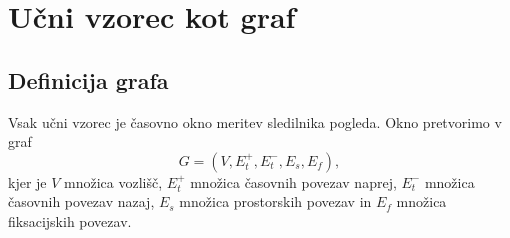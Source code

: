 
\section{Učni vzorec kot graf}
\label{subsec:ucni-vzorec}

\subsection{Definicija grafa}

Vsak učni vzorec je časovno okno meritev sledilnika pogleda.
Okno pretvorimo v graf
\begin{equation}
    G = (V, E_t^+, E_t^-, E_s, E_f),
\end{equation}
kjer je $V$ množica vozlišč, $E_t^+$ množica časovnih povezav naprej, $E_t^-$ množica časovnih povezav nazaj, $E_s$ množica prostorskih povezav in $E_f$ množica fiksacijskih povezav.


